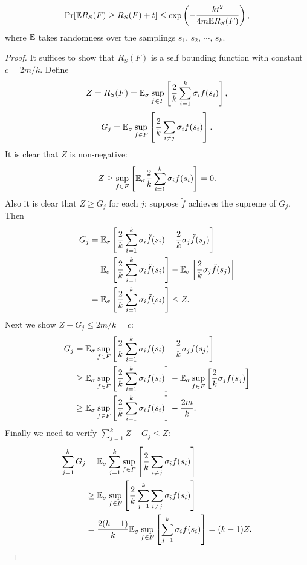 \begin{lemma}
\label{lem1}
$$\Pr[\mathbb{E} R_S(F) \geq R_S(F) + t] \leq \exp\left(-\frac{kt^2}{4m\mathbb{E} R_S(F)}\right),$$
where $\mathbb{E}$ takes randomness over the samplings $s_1$, $s_2$, $\cdots$, $s_k$.
\end{lemma}
\begin{proof}
It suffices to show that $R_S(F)$ is a self bounding function with constant $c=2m/k$.
Define
$$Z = R_S(F) = \mathbb{E}_\sigma \sup_{f\in F} \left[\frac{2}{k}\sum_{i=1}^k \sigma_i f(s_i) \right],$$
$$G_j = \mathbb{E}_\sigma \sup_{f\in F} \left[\frac{2}{k}\sum_{i\not= j} \sigma_i f(s_i) \right].$$
It is clear that $Z$ is non-negative:
$$Z \geq \sup_{f\in F} \left[ \mathbb{E}_\sigma \frac{2}{k}\sum_{i=1}^k \sigma_i f(s_i) \right]=0.$$
Also it is clear that $Z \geq G_j$ for each $j$: suppose $\tilde{f}$ achieves the supreme of $G_j$. Then
$$\begin{aligned}
G_j &= \mathbb{E}_\sigma \left[\frac{2}{k}\sum_{i=1}^k \sigma_i \tilde{f}(s_i) - \frac{2}{k} \sigma_j \tilde{f}(s_j)\right] \\
&= \mathbb{E}_\sigma \left[\frac{2}{k}\sum_{i=1}^k \sigma_i \tilde{f}(s_i)\right] - \mathbb{E}_\sigma \left[ \frac{2}{k} \sigma_j \tilde{f}(s_j)\right] \\
&= \mathbb{E}_\sigma \left[\frac{2}{k}\sum_{i=1}^k \sigma_i \tilde{f}(s_i) \right]  \leq Z.
\end{aligned}$$
Next we show $Z- G_j \leq 2m/k =c$:
$$\begin{aligned}
G_j &= \mathbb{E}_\sigma \sup_{f\in F} \left[ \frac{2}{k} \sum_{i=1}^k \sigma_i f(s_i) - \frac{2}{k} \sigma_j f(s_j) \right] \\
&\geq \mathbb{E}_\sigma \sup_{f\in F} \left[ \frac{2}{k} \sum_{i=1}^k \sigma_i f(s_i) \right] - \mathbb{E}_\sigma \sup_{f\in F} \left[ \frac{2}{k} \sigma_j f(s_j) \right] \\
&\geq \mathbb{E}_\sigma \sup_{f\in F} \left[ \frac{2}{k} \sum_{i=1}^k \sigma_i f(s_i) \right] - \frac{2m}{k}.
\end{aligned}$$
Finally we need to verify $\sum_{j=1}^k Z-G_j \leq Z$:
$$\begin{aligned}
\sum_{j=1}^k G_j &= \mathbb{E}_\sigma \sum_{j=1}^k \sup_{f\in F} \left[ \frac{2}{k}\sum_{i\not= j} \sigma_i f(s_i) \right]\\
&\geq \mathbb{E}_\sigma \sup_{f\in F}\left[ \frac{2}{k} \sum_{j=1}^k \sum_{i\not= j} \sigma_i f(s_i) \right]\\
&=\frac{2(k-1)}{k} \mathbb{E}_\sigma \sup_{f\in F}\left[\sum_{j=1}^k \sigma_i f(s_i) \right] = (k-1)Z.
\end{aligned}$$
\end{proof}

